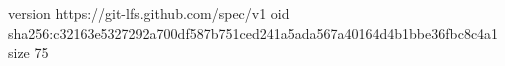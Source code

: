 version https://git-lfs.github.com/spec/v1
oid sha256:c32163e5327292a700df587b751ced241a5ada567a40164d4b1bbe36fbc8c4a1
size 75
